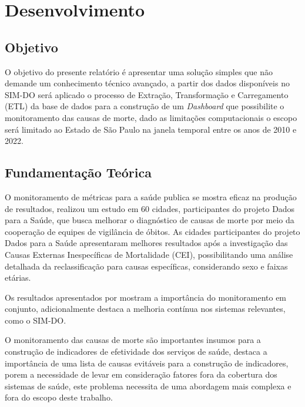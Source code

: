 

\chapter{Desenvolvimento}\label{cap_exemplos}

\section{Objetivo}

O objetivo do presente relatório é apresentar uma solução simples que não demande um conhecimento técnico avançado, a partir dos dados disponíveis no SIM-DO será aplicado o processo de Extração, Transformação e Carregamento (ETL) da base de dados para a construção de um \textit{Dashboard} que possibilite o monitoramento das causas de morte, dado as limitações computacionais o escopo será limitado ao Estado de São Paulo na janela temporal entre os anos de 2010 e 2022.

\section{Fundamentação Teórica}

O monitoramento de métricas para a saúde publica se mostra eficaz na produção de resultados,  realizou um estudo em 60 cidades, participantes do projeto Dados para a Saúde, que busca melhorar o diagnóstico de causas de morte por meio da cooperação de equipes de vigilância de óbitos. As cidades participantes do projeto Dados para a Saúde apresentaram melhores resultados após a investigação das Causas Externas Inespecíficas de Mortalidade (CEI), possibilitando uma análise detalhada da reclassificação para causas específicas, considerando sexo e faixas etárias.

Os resultados apresentados por  mostram a importância do monitoramento em conjunto, adicionalmente destaca a melhoria contínua nos sistemas relevantes, como o SIM-DO.

O monitoramento das causas de morte são importantes insumos para a construção de indicadores de efetividade dos serviços de saúde,  destaca a importância de uma lista de causas evitáveis para a construção de indicadores, porem a necessidade de levar em consideração fatores fora da cobertura dos sistemas de saúde, este problema necessita de uma abordagem mais complexa e fora do escopo deste trabalho.

